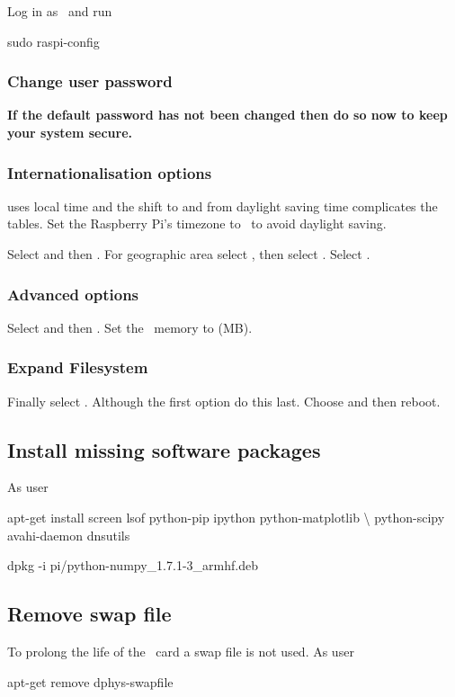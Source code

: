 Log in as \piUser\ and run
\begin{Cmd}
sudo raspi-config
\end{Cmd}

\subsubsection{Change user password}
\textbf{If the default password has not been changed then do so now to keep
your system secure.}

\subsubsection{Internationalisation options}
 uses local time and the shift to and from daylight
saving time complicates the  tables. Set the Raspberry
Pi's timezone to \utc\ to avoid daylight saving.

Select  and
then . For geographic area select %
, then select \code{\utc}. Select .

\subsubsection{Advanced options}
Select  and then . Set the \gpu\ memory to  (MB).

\subsubsection{Expand Filesystem}
Finally select . Although the first option
do this last. Choose  and then reboot.

\subsection{Install missing software packages}
As user \rootUser
\begin{Cmd}
apt-get install screen lsof python-pip ipython python-matplotlib \textbackslash
    python-scipy avahi-daemon dnsutils

dpkg -i {\mytilde}pi/python-numpy_1.7.1-3_armhf.deb
\end{Cmd}

\subsection{Remove swap file}
To prolong the life of the \sd\ card a swap file is not used. As user
\rootUser
\begin{Cmd}
apt-get remove dphys-swapfile  
\end{Cmd}


